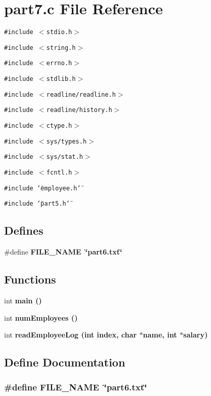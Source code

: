 \section{part7.c File Reference}
\label{part7_8c}
{\tt \#include $<$stdio.h$>$}\par
{\tt \#include $<$string.h$>$}\par
{\tt \#include $<$errno.h$>$}\par
{\tt \#include $<$stdlib.h$>$}\par
{\tt \#include $<$readline/readline.h$>$}\par
{\tt \#include $<$readline/history.h$>$}\par
{\tt \#include $<$ctype.h$>$}\par
{\tt \#include $<$sys/types.h$>$}\par
{\tt \#include $<$sys/stat.h$>$}\par
{\tt \#include $<$fcntl.h$>$}\par
{\tt \#include \char`\"{}employee.h\char`\"{}}\par
{\tt \#include \char`\"{}part5.h\char`\"{}}\par
\subsection*{Defines}
\begin{CompactItemize}
\item 
\#define \bf{FILE\_\-NAME}~\char`\"{}part6.txt\char`\"{}
\end{CompactItemize}
\subsection*{Functions}
\begin{CompactItemize}
\item 
int \bf{main} ()
\item 
int \bf{num\-Employees} ()
\item 
int \bf{read\-Employee\-Log} (int index, char $\ast$name, int $\ast$salary)
\end{CompactItemize}


\subsection{Define Documentation}
\subsubsection{\setlength{\rightskip}{0pt plus 5cm}\#define FILE\_\-NAME~\char`\"{}part6.txt\char`\"{}}\label{part7_8c_b117546549783a058d0321a287699579}




